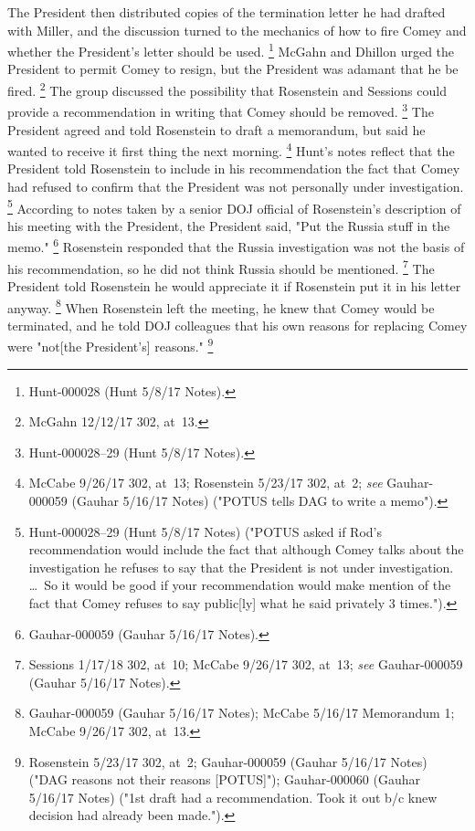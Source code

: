 {The President then distributed copies of the termination letter he had drafted with Miller, and the discussion turned to the mechanics of how to fire Comey and whether the President's letter should be used.%
\footnote{Hunt-000028 (Hunt 5/8/17 Notes).}
McGahn and Dhillon urged the President to permit Comey to resign, but the President was adamant that he be fired.%
\footnote{McGahn 12/12/17 302, at~13.}
The group discussed the possibility that Rosenstein and Sessions could provide a recommendation in writing that Comey should be removed.%
\footnote{Hunt-000028--29 (Hunt 5/8/17 Notes).}
The President agreed and told Rosenstein to draft a memorandum, but said he wanted to receive it first thing the next morning.%
\footnote{McCabe 9/26/17 302, at~13;
Rosenstein 5/23/17 302, at~2;
\textit{see} Gauhar-000059 (Gauhar 5/16/17 Notes) ("POTUS tells DAG to write a memo").}
Hunt's notes reflect that the President told Rosenstein to include in his recommendation the fact that Comey had refused to confirm that the President was not personally under investigation.%
\footnote{Hunt-000028--29 (Hunt 5/8/17 Notes) ("POTUS asked if Rod's recommendation would include the fact that although Comey talks about the investigation he refuses to say that the President is not under investigation.
\dots~So it would be good if your recommendation would make mention of the fact that Comey refuses to say public[ly] what he said privately 3 times.").}
According to notes taken by a senior DOJ official of Rosenstein's description of his meeting with the President, the President said, "Put the Russia stuff in the memo."%
\footnote{Gauhar-000059 (Gauhar 5/16/17 Notes).}
Rosenstein responded that the Russia investigation was not the basis of his recommendation, so he did not think Russia should be mentioned.%
\footnote{Sessions 1/17/18 302, at~10;
McCabe 9/26/17 302, at~13;
\textit{see} Gauhar-000059 (Gauhar 5/16/17 Notes).}
The President told Rosenstein he would appreciate it if Rosenstein put it in his letter anyway.%
\footnote{Gauhar-000059 (Gauhar 5/16/17 Notes);
McCabe 5/16/17 Memorandum 1;
McCabe 9/26/17 302, at~13.}
When Rosenstein left the meeting, he knew that Comey would be terminated, and he told DOJ colleagues that his own reasons for replacing Comey were "not[the President's] reasons."%
\footnote{Rosenstein 5/23/17 302, at~2;
Gauhar-000059 (Gauhar 5/16/17 Notes) ("DAG reasons not their reasons [POTUS]");
Gauhar-000060 (Gauhar 5/16/17 Notes) ("1st draft had a recommendation.
Took it out b/c knew decision had already been made.").}

}
